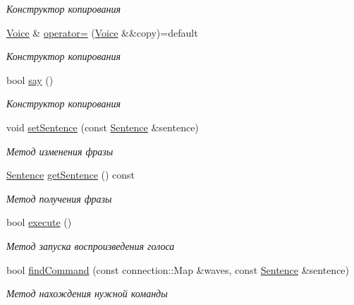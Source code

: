 \begin{DoxyCompactItemize}
\begin{DoxyCompactList}\small\item\em Конструктор копирования \end{DoxyCompactList}\item 
\hyperlink{classJarvis_1_1Voice}{Voice} \& \hyperlink{classJarvis_1_1Voice_a16477e744cf7f448f10d5bf37644ed15}{operator=} (\hyperlink{classJarvis_1_1Voice}{Voice} \&\&copy)=default
\begin{DoxyCompactList}\small\item\em Конструктор копирования \end{DoxyCompactList}\item 
bool \hyperlink{classJarvis_1_1Voice_ab86096f38092a5e0decd804588fb334c}{say} ()
\begin{DoxyCompactList}\small\item\em Конструктор копирования \end{DoxyCompactList}\item 
void \hyperlink{classJarvis_1_1Voice_a3be7bee43cebb0e1ef50a24b399a6954}{set\+Sentence} (const \hyperlink{classJarvis_1_1Sentence}{Sentence} \&sentence)
\begin{DoxyCompactList}\small\item\em Метод изменения фразы \end{DoxyCompactList}\item 
\hyperlink{classJarvis_1_1Sentence}{Sentence} \hyperlink{classJarvis_1_1Voice_ad1f37700f0f76426d34ba31a342505e8}{get\+Sentence} () const
\begin{DoxyCompactList}\small\item\em Метод получения фразы \end{DoxyCompactList}\item 
bool \hyperlink{classJarvis_1_1Voice_aacc05388ae250c1e515f993159443dff}{execute} ()
\begin{DoxyCompactList}\small\item\em Метод запуска воспроизведения голоса \end{DoxyCompactList}\item 
bool \hyperlink{classJarvis_1_1Voice_a509a6161183e0f2f8053371e621379ea}{find\+Command} (const connection\+::\+Map \&waves, const \hyperlink{classJarvis_1_1Sentence}{Sentence} \&sentence)
\begin{DoxyCompactList}\small\item\em Метод нахождения нужной команды \end{DoxyCompactList}\end{DoxyCompactItemize}
